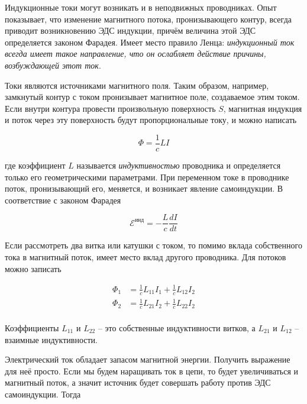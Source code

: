 Индукционные токи могут возникать и в неподвижных проводниках. Опыт показывает, что изменение магнитного потока, пронизывающего контур, всегда приводит возникновению ЭДС индукции, причём величина этой ЭДС определяется законом Фарадея. Имеет место правило Ленца: \textit{индукционный ток всегда имеет такое направление, что он ослабляет действие причины, возбуждающей этот ток}.

Токи являются источниками магнитного поля. Таким образом, например, замкнутый контур с током пронизывает магнитное поле, создаваемое этим током. Если внутри контура провести произвольную поверхность $S$, магнитная индукция и поток через эту поверхность будут пропорциональные току, и можно написать

\begin{equation}
    \Phi = \frac{1}{c} L I
\end{equation}

\noindent
где коэффициент $L$ называется \textit{индуктивностью} проводника и определяется только его геометрическими параметрами. При переменном токе в проводнике поток, пронизывающий его, меняется, и возникает явление самоиндукции. В соответствие с законом Фарадея

\begin{equation}
    \mathcal{E}^\text{инд} = - \frac{L}{c} \frac{dI}{dt}
\end{equation}

Если рассмотреть два витка или катушки с током, то помимо вклада собственного тока в магнитный поток, имеет место вклад другого проводника. Для потоков можно записать

\begin{equation}
    \begin{aligned}
        \Phi_1 &= \frac{1}{c} L_{11} I_1 + \frac{1}{c} L_{12} I_2 \\
        \Phi_2 &= \frac{1}{c} L_{21} I_2 + \frac{1}{c} L_{22} I_2 \\
    \end{aligned}
\end{equation}

\noindent
Коэффициенты $L_{11}$ и $L_{22}$ -- это собственные индуктивности витков, а $L_{21}$ и $L_{12}$ -- взаимные индуктивности.

Электрический ток обладает запасом магнитной энергии. Получить выражение для неё просто. Если мы будем наращивать ток в цепи, то будет увеличиваться и магнитный поток, а значит источник будет совершать работу против ЭДС самоиндукции. Тогда

